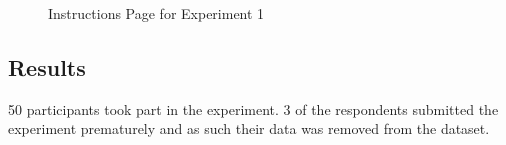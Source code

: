 \documentclass{report}
\theoremstyle{definition}
\begin{document}
\newpage
\thispagestyle{empty}
\begin{figure}[H]
    \centering
    \vspace*{-4.2cm}
    \caption{Instructions Page for Experiment 1}
    \label{fig:first_page}
\end{figure}



\subsection{Results}
50 participants took part in the experiment. 3 of the respondents submitted the experiment prematurely and as such their data was removed from the dataset.
\end{document}
